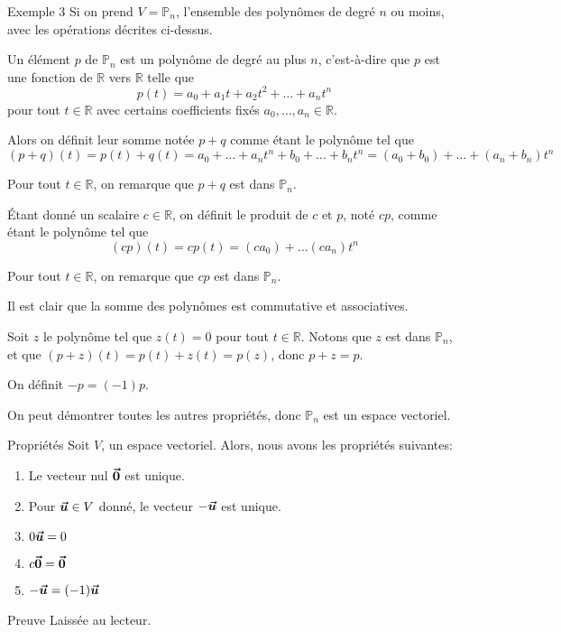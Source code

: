 \documentclass[a4paper]{article}
\begin{document}
\begin{parag}{Exemple 3}
    Si on prend $V = \mathbb{P}_n$, l'ensemble des polynômes de degré $n$ ou moins, avec les opérations décrites ci-dessus.

    Un élément $p$ de $\mathbb{P}_n$ est un polynôme de degré au plus $n$, c'est-à-dire que $p$ est une fonction de $\mathbb{R}$ vers $\mathbb{R}$ telle que
    \[p\left(t\right) = a_0 + a_1 t + a_2 t^2 + \ldots + a_n t^n\]
    pour tout $t \in \mathbb{R}$ avec certains coefficients fixés $a_0, \ldots, a_n \in \mathbb{R}$.

    Alors on définit leur somme notée $p + q$ comme étant le polynôme tel que
    \[\left(p + q\right)\left(t\right) = p\left(t\right) + q\left(t\right) = a_0 + \ldots + a_n t^{n} + b_0 + \ldots + b_n t^n = \left(a_0 + b_0\right) + \ldots + \left(a_n + b_n\right)t^{n}\]

    Pour tout $t \in \mathbb{R}$, on remarque que $p + q$ est dans $\mathbb{P}_n$.

    Étant donné un scalaire $c \in \mathbb{R}$, on définit le produit de $c$ et $p$, noté $cp$, comme étant le polynôme tel que
    \[\left(cp\right)\left(t\right) = c p\left(t\right) = \left(ca_0\right) + \ldots \left(c a_n\right)t^n\]

    Pour tout $t \in \mathbb{R}$, on remarque que $cp$ est dans $\mathbb{P}_n$.

    Il est clair que la somme des polynômes est commutative et associatives.

    Soit $z$ le polynôme tel que $z\left(t\right) = 0$ pour tout $t \in \mathbb{R}$. Notons que $z$ est dans $\mathbb{P}_n$, et que $\left(p + z\right)\left(t\right) = p\left(t\right) + z\left(t\right) = p\left(z\right)$, donc $p + z = p$.

    On définit $-p = \left(-1\right)p$.

    On peut démontrer toutes les autres propriétés, donc $\mathbb{P}_n$ est un espace vectoriel.

\end{parag}

\begin{parag}{Propriétés}
    Soit $V$, un espace vectoriel. Alors, nous avons les propriétés suivantes:
    \begin{enumerate}
        \item Le vecteur nul $\bm{\protect\vec{0}}$ est unique.
        \item Pour $\bm{\protect\vec{u}} \in V$ donné, le vecteur $-\bm{\protect\vec{u}}$ est unique.
        \item $0 \bm{\protect\vec{u}} = 0$
        \item $c \bm{\protect\vec{0}} = \bm{\protect\vec{0}}$
        \item $-\bvec{u} = \left(-1\right)\bvec{u}$
    \end{enumerate}

    \begin{subparag}{Preuve}
        Laissée au lecteur.
    \end{subparag}
\end{parag}
\end{document}
